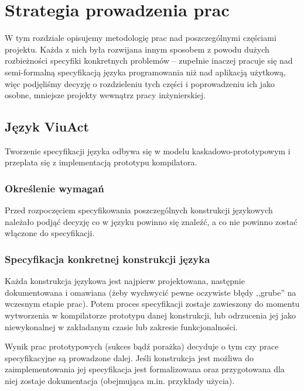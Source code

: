 \chapter{Strategia prowadzenia prac}
\label{strategia_prac}

W tym rozdziale opisujemy metodologię prac nad poszczególnymi częściami projektu. Każda z nich była rozwijana
innym sposobem z powodu dużych rozbieżności specyfiki konkretnych problemów -- zupełnie inaczej pracuje się
nad semi-formalną specyfikacją języka programowania niż nad aplikacją użytkową, więc podjęliśmy decyzję o
rozdzieleniu tych części i poprowadzeniu ich jako osobne, mniejsze projekty wewnątrz pracy inżynierskiej.

\section{Język ViuAct}


Tworzenie specyfikacji języka odbywa się w modelu kaskadowo-prototypowym i przeplata się z implementacją
prototypu kompilatora.

\subsection{Określenie wymagań}

Przed rozpoczęciem specyfikowania poszczególnych konstrukcji językowych należało podjąć decyzję co w języku
powinno się znaleźć, a co nie powinno zostać włączone do specyfikacji.

\subsection{Specyfikacja konkretnej konstrukcji języka}

Każda konstrukcja językowa jest najpierw projektowana, następnie dokumentowana i omawiana (żeby wychwycić
pewne oczywiste błędy ,,grube'' na wczesnym etapie prac). Potem proces specyfikacji zostaje zawieszony do
momentu wytworzenia w kompilatorze prototypu danej konstrukcji, lub odrzucenia jej jako niewykonalnej w
zakładanym czasie lub zakresie funkcjonalności.

Wynik prac prototypowych (sukces bądź porażka) decyduje o tym czy prace specyfikacyjne są prowadzone dalej.
Jeśli konstrukcja jest możliwa do zaimplementowania jej specyfikacja jest formalizowana oraz przygotowana dla
niej zostaje dokumentacja (obejmująca m.in. przykłady użycia).

